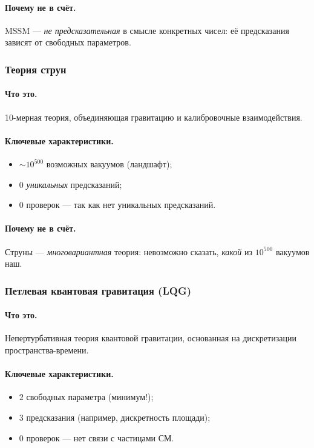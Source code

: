 \documentclass[11pt,a4paper]{article}
\theoremstyle{definition}
\begin{document}
\paragraph{Почему не в счёт.}
MSSM — \emph{не предсказательная} в смысле конкретных чисел: 
её предсказания зависят от свободных параметров.

\subsubsection{Теория струн}

\paragraph{Что это.} 
10-мерная теория, объединяющая гравитацию и калибровочные 
взаимодействия.

\paragraph{Ключевые характеристики.}
\begin{itemize}
    \item $\sim 10^{500}$ возможных вакуумов (ландшафт);
    \item $0$ \emph{уникальных} предсказаний;
    \item $0$ проверок — так как нет уникальных предсказаний.
\end{itemize}

\paragraph{Почему не в счёт.}
Струны — \emph{многовариантная} теория: невозможно сказать, 
\emph{какой} из $10^{500}$ вакуумов наш.

\subsubsection{Петлевая квантовая гравитация (LQG)}

\paragraph{Что это.} 
Непертурбативная теория квантовой гравитации, основанная 
на дискретизации пространства-времени.

\paragraph{Ключевые характеристики.}
\begin{itemize}
    \item $2$ свободных параметра (минимум!);
    \item $3$ предсказания (например, дискретность площади);
    \item $0$ проверок — нет связи с частицами СМ.
\end{itemize}
\end{document}
